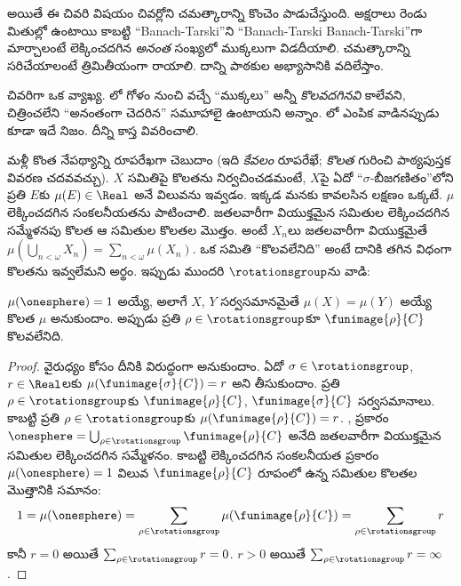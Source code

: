 \documentclass[../../../include/open-logic-section]{subfiles}
\begin{document}
అయితే ఈ చివరి విషయం  చివర్లోని చమత్కారాన్ని కొంచెం పాడుచేస్తుంది. అక్షరాలు రెండు మితుల్లో ఉంటాయి కాబట్టి ``Banach-Tarski''ని ``Banach-Tarski Banach-Tarski''గా మార్చాలంటే లెక్కించదగిన \emph{అనంత} సంఖ్యలో ముక్కలుగా విడదీయాలి. చమత్కారాన్ని సరిచేయాలంటే త్రిమితీయంగా రాయాలి. దాన్ని పాఠకుల అభ్యాసానికి వదిలేస్తాం.

చివరిగా ఒక వ్యాఖ్య. లో గోళం నుంచి వచ్చే ``ముక్కలు'' అన్నీ \emph{కొలవదగినవి} కాలేవని, చిత్రించలేని ``అనంతంగా చెదరిన'' సమూహాలై ఉంటాయని అన్నాం. లో ఎంపిక వాడినప్పుడు కూడా ఇదే నిజం. దీన్ని కాస్త వివరించాలి.

మళ్లీ కొంత నేపథ్యాన్ని రూపరేఖగా చెబుదాం (ఇది \emph{కేవలం} రూపరేఖే; \emph{కొలత} గురించి పాఠ్యపుస్తక వివరణ చదవవచ్చు). $X$ సమితిపై కొలతను నిర్వచించడమంటే, $X$పై ఏదో ``$\sigma$-బీజగణితం''లోని ప్రతి $E$కు $\mu(E) \in
\Real$ అనే విలువను ఇవ్వడం. ఇక్కడ మనకు కావలసిన లక్షణం ఒక్కటే.
$\mu$ లెక్కించదగిన సంకలనీయతను పాటించాలి. జతలవారీగా వియుక్తమైన
సమితుల లెక్కించదగిన సమ్మేళనపు కొలత ఆ సమితుల కొలతల మొత్తం.
అంటే $X_n$లు జతలవారీగా వియుక్తమైతే $\mu(\bigcup_{n < \omega} X_n) = \sum_{n < \omega}\mu(X_n)$. ఒక సమితి ``కొలవలేనిది'' అంటే దానికి తగిన విధంగా కొలతను ఇవ్వలేమని అర్థం. ఇప్పుడు ముందరి $\rotationsgroup$ను వాడి:

\begin{cor}[విటాలి]
$\mu(\onesphere) = 1$ అయ్యే, అలాగే $X$, $Y$ సర్వసమానమైతే $\mu(X) = \mu(Y)$ అయ్యే కొలత $\mu$ అనుకుందాం. అప్పుడు ప్రతి $\rho \in
\rotationsgroup$కూ $\funimage{\rho}{C}$ కొలవలేనిది.
\end{cor}

\begin{proof}
వైరుధ్యం కోసం దీనికి విరుద్ధంగా అనుకుందాం. ఏదో $\sigma \in \rotationsgroup$, $r \in \Real$లకు $\mu(\funimage{\sigma}{C}) =
r$ అని తీసుకుందాం. ప్రతి $\rho \in \rotationsgroup$కు $\funimage{\rho}{C}$, $\funimage{\sigma}{C}$ సర్వసమానాలు. కాబట్టి ప్రతి $\rho \in
\rotationsgroup$కు $\mu(\funimage{\rho}{C}) = r$. ,  ప్రకారం $\onesphere =
\bigcup_{\rho \in \rotationsgroup}\funimage{\rho}{C}$ అనేది జతలవారీగా వియుక్తమైన సమితుల లెక్కించదగిన సమ్మేళనం. కాబట్టి లెక్కించదగిన సంకలనీయత ప్రకారం $\mu(\onesphere) = 1$ విలువ $\funimage{\rho}{C}$ రూపంలో ఉన్న సమితుల కొలతల మొత్తానికి సమానం:
\[
	1 = \mu(\onesphere) = \sum_{\rho \in \rotationsgroup}\mu(\funimage{\rho}{C}) = \sum_{\rho \in \rotationsgroup}r
\]
కానీ $r = 0$ అయితే $\sum_{\rho \in \rotationsgroup}r = 0$. $r
> 0$ అయితే $\sum_{\rho \in \rotationsgroup}r = \infty$.
\end{proof}
\end{document}
